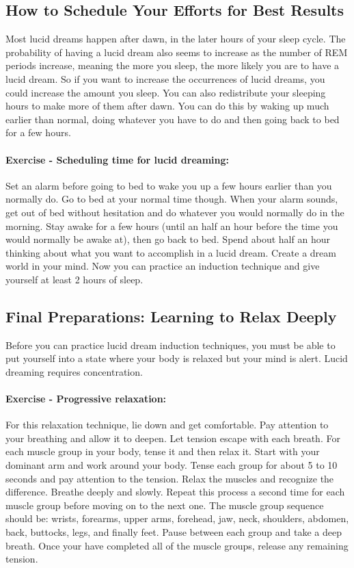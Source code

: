 \documentclass{article}
\begin{document}
\subsection{How to Schedule Your Efforts for Best Results}
Most lucid dreams happen after dawn, in the later hours of your sleep cycle. The probability of having a lucid dream also seems to increase as the number of REM periods increase, meaning the more you sleep, the more likely you are to have a lucid dream. So if you want to increase the occurrences of lucid dreams, you could increase the amount you sleep. You can also redistribute your sleeping hours to make more of them after dawn. You can do this by waking up much earlier than normal, doing whatever you have to do and then going back to bed for a few hours.

\paragraph{Exercise - Scheduling time for lucid dreaming:} Set an alarm before going to bed to wake you up a few hours earlier than you normally do. Go to bed at your normal time though. When your alarm sounds, get out of bed without hesitation and do whatever you would normally do in the morning. Stay awake for a few hours (until an half an hour before the time you would normally be awake at), then go back to bed. Spend about half an hour thinking about what you want to accomplish in a lucid dream. Create a dream world in your mind. Now you can practice an induction technique and give yourself at least 2 hours of sleep.

\subsection{Final Preparations: Learning to Relax Deeply}
Before you can practice lucid dream induction techniques, you must be able to put yourself into a state where your body is relaxed but your mind is alert. Lucid dreaming requires concentration.

\paragraph{Exercise - Progressive relaxation:} For this relaxation technique, lie down and get comfortable. Pay attention to your breathing and allow it to deepen. Let tension escape with each breath. For each muscle group in your body, tense it and then relax it. Start with your dominant arm and work around your body. Tense each group for about 5 to 10 seconds and pay attention to the tension. Relax the muscles and recognize the difference. Breathe deeply and slowly. Repeat this process a second time for each muscle group before moving on to the next one. The muscle group sequence should be: wrists, forearms, upper arms, forehead, jaw, neck, shoulders, abdomen, back, buttocks, legs, and finally feet. Pause between each group and take a deep breath. Once your have completed all of the muscle groups, release any remaining tension.
\end{document}
